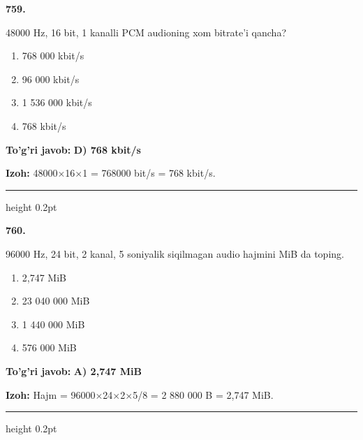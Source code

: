 \documentclass[10pt,a4paper,oneside]{article}
\begin{document}
\noindent\textbf{\color{ink}759.}
\par
48000 Hz, 16 bit, 1 kanalli PCM audioning xom bitrate'i qancha?
\begin{enumerate}[label=\Alph*),leftmargin=9mm]
\item 768 000 kbit/s
\item 96 000 kbit/s
\item 1 536 000 kbit/s
\item 768 kbit/s
\end{enumerate}
\begin{tcolorbox}[enhanced,breakable,colback=teal!4,colframe=teal!50!black,boxrule=0.5pt,arc=1.1mm,left=3mm,right=3mm,top=1.7mm,bottom=1.7mm,before skip=2mm,after skip=2mm]
\textbf{\color{teal}To'g'ri javob:} \textbf{D) 768 kbit/s}
\par\smallskip
\textbf{Izoh:} 48000\ensuremath{\times}16\ensuremath{\times}1 = 768000 bit/s = 768 kbit/s.
\end{tcolorbox}
\vspace{2mm}\hrule height 0.2pt \vspace{3mm}

\noindent\textbf{\color{ink}760.}
\par
96000 Hz, 24 bit, 2 kanal, 5 soniyalik siqilmagan audio hajmini MiB da toping.
\begin{enumerate}[label=\Alph*),leftmargin=9mm]
\item 2,747 MiB
\item 23 040 000 MiB
\item 1 440 000 MiB
\item 576 000 MiB
\end{enumerate}
\begin{tcolorbox}[enhanced,breakable,colback=teal!4,colframe=teal!50!black,boxrule=0.5pt,arc=1.1mm,left=3mm,right=3mm,top=1.7mm,bottom=1.7mm,before skip=2mm,after skip=2mm]
\textbf{\color{teal}To'g'ri javob:} \textbf{A) 2,747 MiB}
\par\smallskip
\textbf{Izoh:} Hajm = 96000\ensuremath{\times}24\ensuremath{\times}2\ensuremath{\times}5/8 = 2 880 000 B = 2,747 MiB.
\end{tcolorbox}
\vspace{2mm}\hrule height 0.2pt \vspace{3mm}
\end{document}
